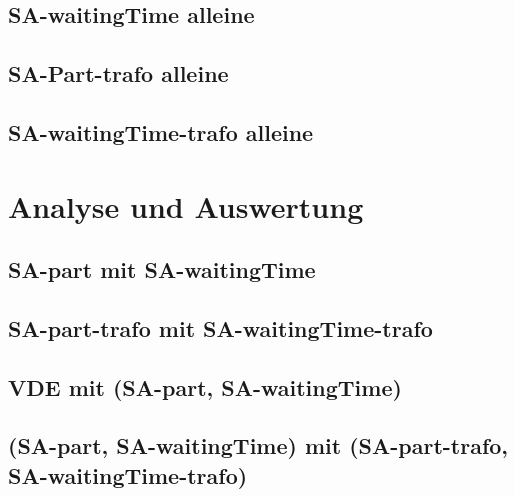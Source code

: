 \subsection{SA-waitingTime alleine}
\subsection{SA-Part-trafo alleine}
\subsection{SA-waitingTime-trafo alleine}
\section{Analyse und Auswertung}
\subsection{SA-part mit SA-waitingTime}
\subsection{SA-part-trafo mit SA-waitingTime-trafo}
\subsection{VDE mit (SA-part, SA-waitingTime)}
\subsection{(SA-part, SA-waitingTime) mit (SA-part-trafo, SA-waitingTime-trafo)}

